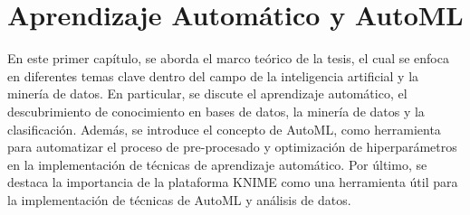 \chapter{Aprendizaje Automático y AutoML}\label{chap:1}

En este primer capítulo, se aborda el marco teórico de la tesis, el cual se enfoca en diferentes temas clave dentro del campo de la inteligencia artificial y la minería de datos. En particular, se discute el aprendizaje automático, el descubrimiento de conocimiento en bases de datos, la minería de datos y la clasificación. Además, se introduce el concepto de AutoML, como herramienta para automatizar el proceso de pre-procesado y optimización de hiperparámetros en la implementación de técnicas de aprendizaje automático. Por último, se destaca la importancia de la plataforma KNIME como una herramienta útil para la implementación de técnicas de AutoML y análisis de datos.

